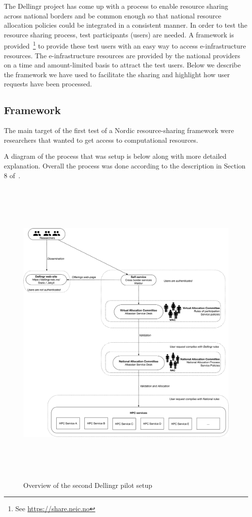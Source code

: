 \documentclass{article}
\newcommand{\dell}{Dellingr\xspace}
\newcommand{\einfra}{e-infrastructure\xspace}
\newcommand{\np}{national provider\xspace}
\newcommand{\nps}{\np{s}\xspace}
\newcommand{\pilot}{first test of a Nordic resource-sharing framework\xspace}
\begin{document}
The \dell project has come up with a process to enable resource sharing across national borders and be common enough so that national resource allocation policies could be integrated in a consistent manner.
In order to test the resource sharing process, test participants (users) are needed.
A framework is provided~\footnote{See \url{https://share.neic.no}} to provide these test users with an easy way to access \einfra resources.
The \einfra resources are provided by the \nps on a time and amount-limited basis to attract the test users.
Below we describe the framework we have used to facilitate the sharing and highlight how user requests have been processed.

\subsection{Framework}
\label{ssec:framework}

The main target of the \pilot were researchers that wanted to get access to computational resources.

A diagram of the process that was setup is below along with more detailed explanation. 
Overall the process was done according to the description in Section 8 
of~\cite{dellingr-p2-do5}.

\begin{figure}
\centering
\includegraphics[height=450pt]{diagram.pdf}
\caption{Overview of the second \dell pilot setup}
\end{figure}
\end{document}
